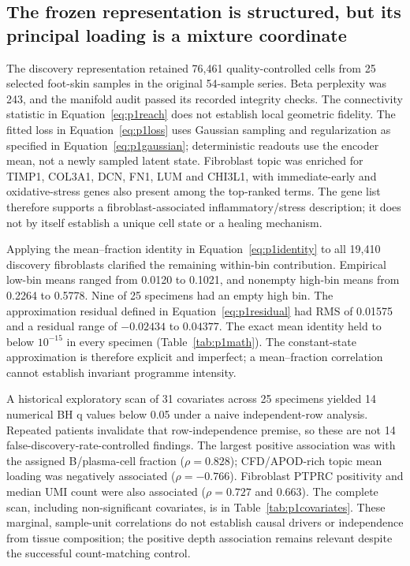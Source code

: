 
\subsection{The frozen representation is structured, but its principal loading is a mixture coordinate}
The discovery representation retained 76,461 quality-controlled cells from 25 selected foot-skin samples in the original 54-sample series. Beta perplexity was 243, and the manifold audit passed its recorded integrity checks. The connectivity statistic in Equation~\eqref{eq:p1reach} does not establish local geometric fidelity. The fitted loss in Equation~\eqref{eq:p1loss} uses Gaussian sampling and regularization as specified in Equation~\eqref{eq:p1gaussian}; deterministic readouts use the encoder mean, not a newly sampled latent state. Fibroblast topic was enriched for TIMP1, COL3A1, DCN, FN1, LUM and CHI3L1, with immediate-early and oxidative-stress genes also present among the top-ranked terms. The gene list therefore supports a fibroblast-associated inflammatory/stress description; it does not by itself establish a unique cell state or a healing mechanism.

Applying the mean--fraction identity in Equation~\eqref{eq:p1identity} to all 19,410 discovery fibroblasts clarified the remaining within-bin contribution. Empirical low-bin means ranged from 0.0120 to 0.1021, and nonempty high-bin means from 0.2264 to 0.5778. Nine of 25 specimens had an empty high bin. The approximation residual defined in Equation~\eqref{eq:p1residual} had RMS of 0.01575 and a residual range of $-0.02434$ to $0.04377$. The exact mean identity held to below $10^{-15}$ in every specimen (Table~\ref{tab:p1math}). The constant-state approximation is therefore explicit and imperfect; a mean--fraction correlation cannot establish invariant programme intensity.

A historical exploratory scan of 31 covariates across 25 specimens yielded 14 numerical BH q values below 0.05 under a naive independent-row analysis. Repeated patients invalidate that row-independence premise, so these are not 14 false-discovery-rate-controlled findings. The largest positive association was with the assigned B/plasma-cell fraction ($\rho=0.828$); CFD/APOD-rich topic mean loading was negatively associated ($\rho=-0.766$). Fibroblast PTPRC positivity and median UMI count were also associated ($\rho=0.727$ and 0.663). The complete scan, including non-significant covariates, is in Table~\ref{tab:p1covariates}. These marginal, sample-unit correlations do not establish causal drivers or independence from tissue composition; the positive depth association remains relevant despite the successful count-matching control.

